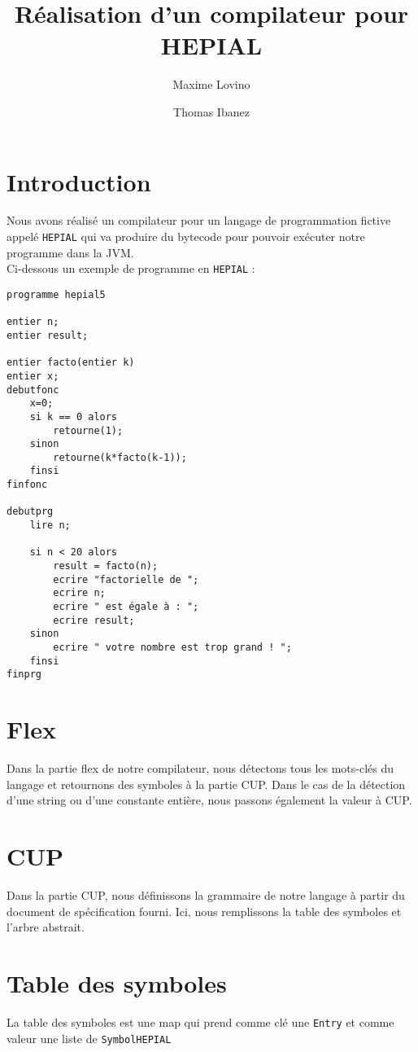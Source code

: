 \documentclass{article}
\title{Réalisation d'un compilateur pour HEPIAL}
\author{Maxime Lovino \and Thomas Ibanez}
\begin{document}
\maketitle
\newpage
\tableofcontents
\newpage
\section{Introduction}

Nous avons réalisé un compilateur pour un langage de programmation fictive appelé \verb+HEPIAL+ qui va produire du bytecode pour pouvoir exécuter notre programme dans la JVM. \\

Ci-dessous un exemple de programme en \verb+HEPIAL+ : \\

\begin{lstlisting}
programme hepial5

entier n;
entier result;

entier facto(entier k)
entier x;
debutfonc
	x=0;
	si k == 0 alors
		retourne(1);
	sinon
		retourne(k*facto(k-1));
	finsi
finfonc

debutprg
	lire n;

	si n < 20 alors
		result = facto(n);
		ecrire "factorielle de ";
		ecrire n;
		ecrire " est égale à : ";
		ecrire result;
	sinon
		ecrire " votre nombre est trop grand ! ";
	finsi
finprg
\end{lstlisting}
\section{Flex}
Dans la partie flex de notre compilateur, nous détectons tous les mots-clés du langage et retournons des symboles à la partie CUP. Dans le cas de la détection d'une string ou d'une constante entière, nous passons également la valeur à CUP.
\section{CUP}
Dans la partie CUP, nous définissons la grammaire de notre langage à partir du document de spécification fourni. Ici, nous remplissons la table des symboles et l'arbre abstrait.
\section{Table des symboles}
La table des symboles est une map qui prend comme clé une \verb+Entry+ et comme valeur une liste de \verb+SymbolHEPIAL+ \\
\end{document}

